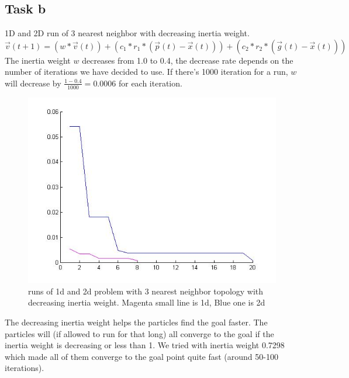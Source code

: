 \documentclass[12pt, a4paper]{article}
\begin{document}
\subsection{Task b}
1D and 2D run of 3 nearest neighbor with decreasing inertia weight.
$\vec{v}(t+1)=(w*\vec{v}(t))+(c_1*r_1*(\vec{p}(t)-\vec{x}(t))) +(c_2*r_2*(\vec{g}(t)-\vec{x}(t)))$\\
The inertia weight $w$ decreases from 1.0 to 0.4, the decrease rate depends on the number of iterations we have decided to use. If there's 1000 iteration for a run, $w$ will decrease by $\frac{1-0.4}{1000} = 0.0006
$ for each iteration.
\begin{figure}[H]
\begin{center}
\includegraphics[width=\linewidth]{3nn_with_inertia}
\caption{runs of 1d and 2d problem with 3 nearest neighbor topology with decreasing inertia weight.
Magenta small line is 1d, Blue one is 2d}
\end{center}
\end{figure}
The decreasing inertia weight helps the particles find the goal faster. The particles will (if allowed to run for that long) all converge to the goal if the inertia weight is decreasing or less than 1. We tried with inertia weight 0.7298 which made all of them converge to the goal point quite fast (around 50-100 iterations).
\end{document}
